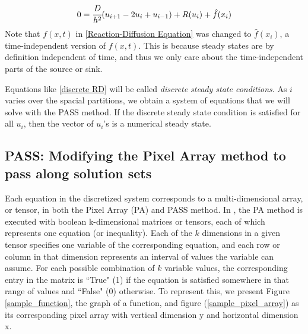 \documentclass[11pt]{article}
\begin{document}
\begin{equation}
    \label{discrete RD}
    0 = \cfrac{D}{h^2} (u_{i+1} - 2u_i + u_{i-1}) + R(u_i) + \hat{f}(x_i)
\end{equation}
Note that $f(x,t)$ in \cref{Reaction-Diffusion Equation} was changed to $\hat{f}(x_i)$, a time-independent version of $f(x,t)$. This is because steady states are by definition independent of time, and thus we only care about the time-independent parts of the source or sink. 

Equations like \eqref{discrete RD} will be called \textit{discrete steady state conditions}. As $i$ varies over the spacial partitions, we obtain a system of equations that we will solve with the PASS method. If the discrete steady state condition is satisfied for all $u_i$, then the vector of $u_i$'s is a numerical steady state.

\subsection{PASS: Modifying the Pixel Array method to pass along solution sets}\label{sec:PASS}

Each equation in the discretized system corresponds to a multi-dimensional array, or tensor, in both the Pixel Array (PA) and PASS method. In \citep{Introduction_to_PA}, the PA method is executed with boolean k-dimensional matrices or tensors, each of which represents one equation (or inequality). Each of the $k$ dimensions in a given tensor specifies one variable of the corresponding equation, and each row or column in that dimension represents an interval of values the variable can assume. For each possible combination of $k$ variable values, the corresponding entry in the matrix is ``True" (1) if the equation is satisfied somewhere in that range of values and ``False" (0) otherwise. To represent this, we present Figure \cref{sample_function}, the graph of a function, and figure (\cref{sample_pixel_array}) as its corresponding pixel array with vertical dimension y and horizontal dimension x.
\end{document}

